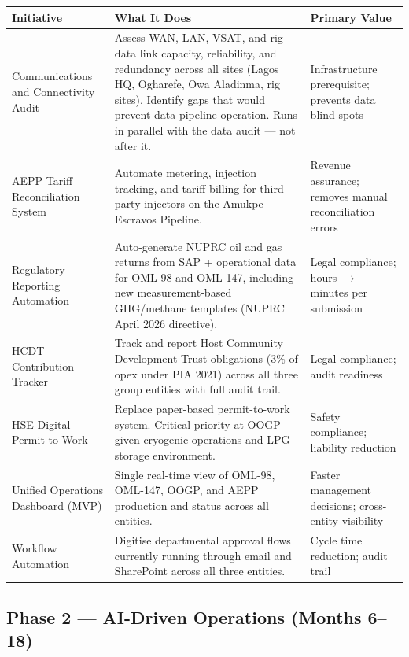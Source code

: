 \documentclass[10pt]{article}
\begin{document}
\vspace{4pt}
\small
\begin{tabularx}{\columnwidth}{@{}lXl@{}}
\toprule
\textbf{Initiative} & \textbf{What It Does} & \textbf{Primary Value} \\
\midrule
Communications and Connectivity Audit
  & Assess WAN, LAN, VSAT, and rig data link capacity, reliability, and
    redundancy across all sites (Lagos HQ, Ogharefe, Owa Aladinma, rig sites).
    Identify gaps that would prevent data pipeline operation. Runs in parallel
    with the data audit --- not after it.
  & Infrastructure prerequisite; prevents data blind spots \\[3pt]
AEPP Tariff Reconciliation System
  & Automate metering, injection tracking, and tariff billing for third-party
    injectors on the Amukpe-Escravos Pipeline.
  & Revenue assurance; removes manual reconciliation errors \\[3pt]
Regulatory Reporting Automation
  & Auto-generate NUPRC oil and gas returns from SAP + operational data for
    OML-98 and OML-147, including new measurement-based GHG/methane templates
    (NUPRC April 2026 directive).
  & Legal compliance; hours $\to$ minutes per submission \\[3pt]
HCDT Contribution Tracker
  & Track and report Host Community Development Trust obligations (3\% of
    opex under PIA 2021) across all three group entities with full audit trail.
  & Legal compliance; audit readiness \\[3pt]
HSE Digital Permit-to-Work
  & Replace paper-based permit-to-work system. Critical priority at OOGP
    given cryogenic operations and LPG storage environment.
  & Safety compliance; liability reduction \\[3pt]
Unified Operations Dashboard (MVP)
  & Single real-time view of OML-98, OML-147, OOGP, and AEPP production
    and status across all entities.
  & Faster management decisions; cross-entity visibility \\[3pt]
Workflow Automation
  & Digitise departmental approval flows currently running through email
    and SharePoint across all three entities.
  & Cycle time reduction; audit trail \\
\bottomrule
\end{tabularx}
\normalsize

\vspace{8pt}
\subsection*{Phase 2 --- AI-Driven Operations (Months 6--18)}
\end{document}
